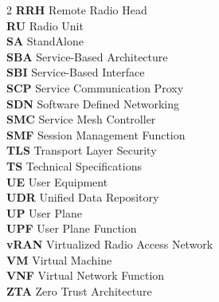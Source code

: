\begin{multicols}{2}
\textbf{RRH} \quad Remote Radio Head\\
\textbf{RU} \quad Radio Unit\\
\textbf{SA} \quad StandAlone\\
\textbf{SBA} \quad Service-Based Architecture\\
\textbf{SBI} \quad Service-Based Interface\\
\textbf{SCP} \quad Service Communication Proxy\\
\textbf{SDN} \quad Software Defined Networking\\
\textbf{SMC} \quad Service Mesh Controller\\
\textbf{SMF} \quad Session Management Function\\
\textbf{TLS} \quad Transport Layer Security\\
\textbf{TS} \quad Technical Specifications\\
\textbf{UE} \quad User Equipment\\
\textbf{UDR} \quad Unified Data Repository\\
\textbf{UP} \quad User Plane\\
\textbf{UPF} \quad User Plane Function\\
\textbf{vRAN} \quad Virtualized Radio Access Network\\
\textbf{VM} \quad Virtual Machine\\
\textbf{VNF} \quad Virtual Network Function\\
\textbf{ZTA} \quad Zero Trust Architecture\\
\end{multicols}

\thispagestyle{plain}
\clearpage

